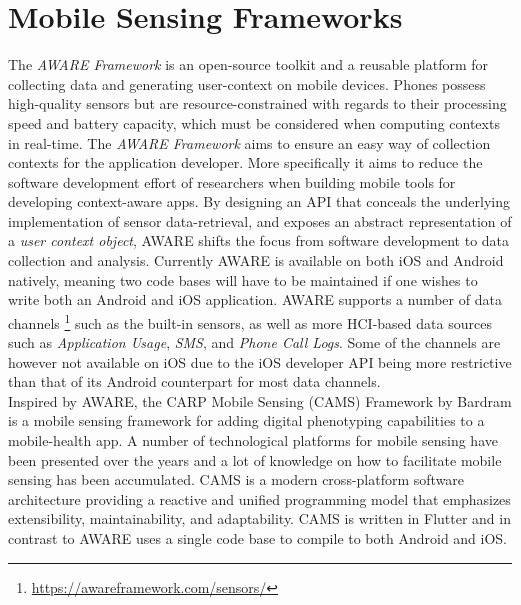 \section{Mobile Sensing Frameworks}
The \textit{AWARE Framework} \cite{aware2015} is an open-source toolkit and a reusable platform for collecting data and generating user-context on mobile devices. Phones possess high-quality sensors but are resource-constrained with regards to their processing speed and battery capacity, which must be considered when computing contexts in real-time. The \textit{AWARE Framework} aims to ensure an easy way of collection contexts for the application developer. More specifically it aims to reduce the software development effort of researchers when building mobile tools for developing context-aware apps. By designing an API that conceals the underlying implementation of sensor data-retrieval, and exposes an abstract representation of a \textit{user context object}, AWARE shifts the focus from software development to data collection and analysis. Currently AWARE is available on both iOS and Android natively, meaning two code bases will have to be maintained if one wishes to write both an Android and iOS application. AWARE supports a number of data channels \footnote{\url{https://awareframework.com/sensors/}} such as the built-in sensors, as well as more HCI-based data sources such as \textit{Application Usage}, \textit{SMS}, and \textit{Phone Call Logs}. Some of the channels are however not available on iOS due to the iOS developer API being more restrictive than that of its Android counterpart for most data channels.\\

Inspired by AWARE, the CARP Mobile Sensing (CAMS) Framework by Bardram \cite{CAMS} is a mobile sensing framework for adding digital phenotyping capabilities to a mobile-health app. A number of technological platforms for mobile sensing have been presented over the years and a lot of knowledge on how to facilitate mobile sensing has been accumulated. CAMS is a modern cross-platform software architecture providing a reactive and unified programming model that emphasizes extensibility, maintainability, and adaptability. CAMS is written in Flutter and in contrast to AWARE uses a single code base to compile to both Android and iOS.\\

